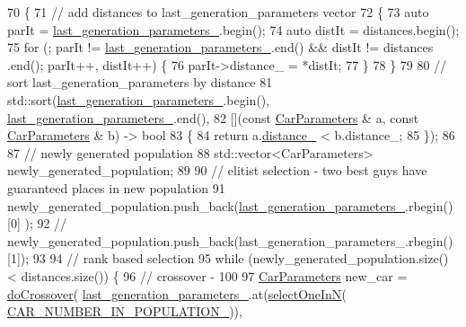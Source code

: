 \begin{DoxyCode}
70                                                                                                           \{
71     \textcolor{comment}{// add distances to last\_generation\_parameters vector}
72     \{
73         \textcolor{keyword}{auto} parIt = \hyperlink{classEvolutionaryAlgorithm_a85d23b07f2b2c8b1df581a9566111fa7}{last\_generation\_parameters\_}.begin();
74         \textcolor{keyword}{auto} distIt = distances.begin();
75         \textcolor{keywordflow}{for} (; parIt != \hyperlink{classEvolutionaryAlgorithm_a85d23b07f2b2c8b1df581a9566111fa7}{last\_generation\_parameters\_}.end() && distIt != distances
      .end(); parIt++, distIt++) \{
76             parIt->distance\_ = *distIt;
77         \}
78     \}
79 
80     \textcolor{comment}{// sort last\_generation\_parameters by distance}
81     std::sort(\hyperlink{classEvolutionaryAlgorithm_a85d23b07f2b2c8b1df581a9566111fa7}{last\_generation\_parameters\_}.begin(), 
      \hyperlink{classEvolutionaryAlgorithm_a85d23b07f2b2c8b1df581a9566111fa7}{last\_generation\_parameters\_}.end(),
82         [](\textcolor{keyword}{const} \hyperlink{classCarParameters}{CarParameters} & a, \textcolor{keyword}{const} \hyperlink{classCarParameters}{CarParameters} & b) -> \textcolor{keywordtype}{bool}
83         \{
84             \textcolor{keywordflow}{return} a.\hyperlink{classCarParameters_a79406bde604364dbb6ff6e1a19198303}{distance\_} < b.distance\_;
85         \});
86 
87     \textcolor{comment}{// newly generated population}
88     std::vector<CarParameters> newly\_generated\_population;
89 
90     \textcolor{comment}{// elitist selection - two best guys have guaranteed places in new population}
91     newly\_generated\_population.push\_back(\hyperlink{classEvolutionaryAlgorithm_a85d23b07f2b2c8b1df581a9566111fa7}{last\_generation\_parameters\_}.rbegin()[0]
      );
92 \textcolor{comment}{//    newly\_generated\_population.push\_back(last\_generation\_parameters\_.rbegin()[1]);}
93 
94     \textcolor{comment}{// rank based selection}
95     \textcolor{keywordflow}{while} (newly\_generated\_population.size() < distances.size()) \{
96         \textcolor{comment}{// crossover - 100%
97         \hyperlink{classCarParameters}{CarParameters} new\_car = \hyperlink{classEvolutionaryAlgorithm_a1f0c3d66b8abfdcdf6eedf065580cef6}{doCrossover}(
      \hyperlink{classEvolutionaryAlgorithm_a85d23b07f2b2c8b1df581a9566111fa7}{last\_generation\_parameters\_}.at(\hyperlink{classEvolutionaryAlgorithm_a8efaa380f6d1b9a2f8a6ad44e2d362e2}{selectOneInN}(
      \hyperlink{classEvolutionaryAlgorithm_af466ca42d5d03e212df4575f263f3a8c}{CAR\_NUMBER\_IN\_POPULATION\_})),
}
\end{DoxyCode}
